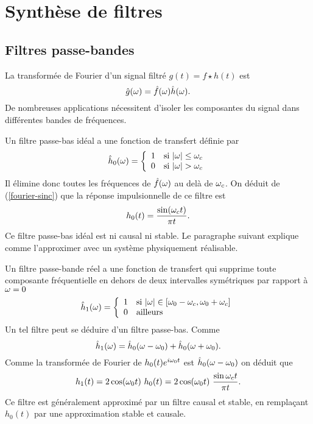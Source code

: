 \section{Synth\`ese de filtres}

\subsection{Filtres passe-bandes}

La transform\'ee
de Fourier d'un signal filtr\'e $g(t) = f \star h (t)$ est
\[
\hat g ({\omega}) = \hat f ({\omega}) \hat h ({\omega}) .
\]
De nombreuses applications n\'ecessitent
d'isoler les composantes du signal
dans diff\'erentes bandes de fr\'equences.

Un filtre
passe-bas id\'eal a une fonction de transfert d\'efinie par
\begin{equation} 
\label{passe-bas}
\hat h_0 ( {\omega}  ) = 
   \left\{ \begin{array}{ll} 
1 & \mbox{si $|{\omega}| \leq {\omega}_c$}\\
0 & \mbox{si $|{\omega}| > {\omega}_c$}
\end{array}
   \right.  
\end{equation}
Il \'elimine donc toutes les fr\'equences de $\hat f ({\omega})$
au del\`a de ${\omega}_c$.
On d\'eduit de (\ref{fourier-sinc}) que la r\'eponse impulsionnelle 
de ce filtre est 
\[
h_0(t) = \frac{\sin ({\omega}_c t)} {\pi t} .
\]
Ce filtre passe-bas id\'eal est ni causal
ni stable. Le paragraphe suivant
explique comme l'approximer avec
un syst\`eme physiquement r\'ealisable.

Un filtre passe-bande r\'eel 
a une fonction de transfert qui supprime
toute composante fr\'equentielle en dehors de deux intervalles
sym\'etriques par rapport \`a ${\omega} = 0$
\begin{equation} 
\hat h_1 ( {\omega}  ) = 
   \left\{ \begin{array}{ll} 
1 & \mbox{si $|{\omega}| \in [{\omega}_0 - {\omega}_c , {\omega}_0 + {\omega}_c ]$}\\
0 & \mbox{ailleurs} 
\end{array}
   \right.  
\end{equation}
Un tel filtre peut se d\'eduire d'un filtre passe-bas. Comme 
\[
\hat h_1({\omega}) = \hat h_0 ({\omega}-{\omega}_0)+ \hat h_0 ({\omega}+{\omega}_0) .
\]
Comme la transform\'ee de Fourier de
$h_0 (t) e^{i{\omega}_0 t}$ est $\hat h_0 ({\omega}-{\omega}_0)$ on d\'eduit que
\[
h_1(t) = 2 \cos ({\omega}_0 t)~ h_0 (t) = 2 \cos ({\omega}_0 t)~  
\frac{\sin {\omega}_c t} {\pi t} .
\]
Ce filtre est g\'en\'eralement approxim\'e par un filtre
causal et stable, en rempla\c{c}ant
$h_0 (t)$ par une approximation stable et causale.


